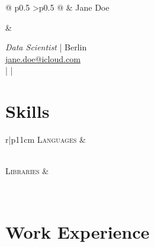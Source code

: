 \documentclass[11pt,a4paper]{article}
\begin{document}
\pagestyle{empty}

\begin{tabular}{@{} p{0.5\textwidth} >{\raggedleft\arraybackslash}p{0.5\textwidth} @{}}
&   \Huge{Jane Doe\medskip} \\
\begin{minipage}[t]{0.5\textwidth}
  
\end{minipage} & \begin{minipage}[t]{0.5\textwidth}
    \begin{flushright}
      \emph{Data Scientist} | Berlin \\
      \href{mailto:jane.doe@icloud.com}{jane.doe@icloud.com} \\
                         | 
                   | 
                  \end{flushright}
  \end{minipage}
\end{tabular}

\section*{Skills}\label{skills}

\begin{flushright}
\begin{tabular}{r|p{11cm}}
\textsc{Languages} & \begin{minipage}[t]{\linewidth} \href{https://janedoe.com/tag/Python}{} 
 \end{minipage} \\
\textsc{Libraries} & \begin{minipage}[t]{\linewidth}   
\href{https://janedoe.com/tag/TensorFlow}{} \end{minipage} \\
\end{tabular}
\end{flushright}

\section*{Work Experience}\label{work-experience}
\end{document}

